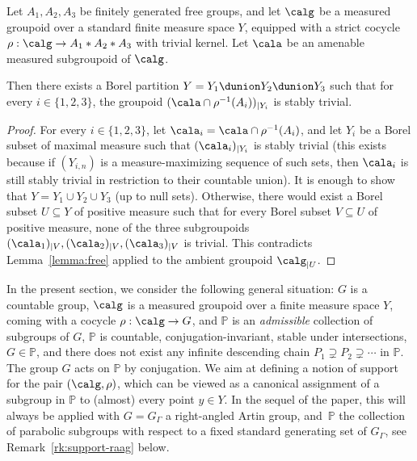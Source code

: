 \begin{cor}\label{cor:free-2}
Let $A_1,A_2,A_3$ be finitely generated free groups, and let $\calg$ be a measured groupoid over a standard finite measure space $Y$, equipped with a strict cocycle $\rho:\calg\to A_1\ast A_2\ast A_3$ with trivial kernel. Let $\cala$ be an amenable measured subgroupoid of $\calg$.

Then there exists a Borel partition $Y=Y_1\dunion Y_2\dunion Y_3$ such that for every $i\in\{1,2,3\}$, the groupoid $(\cala\cap\rho^{-1}(A_i))_{|Y_i}$ is stably trivial.
\end{cor}

\begin{proof}
For every $i\in\{1,2,3\}$, let $\cala_i=\cala\cap\rho^{-1}(A_i)$, and let $Y_i$ be a Borel subset of maximal measure such that $(\cala_i)_{|Y_i}$ is stably trivial (this exists because if $(Y_{i,n})$ is a measure-maximizing sequence of such sets, then $\cala_i$ is still stably trivial in restriction to their countable union). It is enough to show that $Y=Y_1\cup Y_2\cup Y_3$ (up to null sets). Otherwise, there would exist a Borel subset $U\subseteq Y$ of positive measure such that for every Borel subset $V\subseteq U$ of positive measure, none of the three subgroupoids $(\cala_1)_{|V},(\cala_2)_{|V},(\cala_3)_{|V}$ is trivial. This contradicts Lemma~\ref{lemma:free} applied to the ambient groupoid $\calg_{|U}$.
\end{proof}


In the present section, we consider the following general situation: $G$ is a countable group, $\calg$ is a measured groupoid over a finite measure space $Y$, coming with a cocycle $\rho:\calg\to G$, and $\mathbb{P}$ is an \emph{admissible} collection of subgroups of $G$, \ie $\mathbb{P}$ is countable, conjugation-invariant, stable under intersections, $G\in \mathbb {P}$, and there does not exist any infinite descending chain $P_1\supsetneq P_2\supsetneq\cdots$ in $\mathbb{P}$. The group $G$ acts on $\mathbb{P}$ by conjugation. We aim at defining a notion of support for the pair $(\calg,\rho)$, which can be viewed as a canonical assignment of a subgroup in $\mathbb{P}$ to (almost) every point $y\in Y$. In the sequel of the paper, this will always be applied with $G=G_\Gamma$ a right-angled Artin group, and~$\mathbb{P}$ the collection of parabolic subgroups with respect to a fixed standard generating set of $G_\Gamma$, see Remark~\ref{rk:support-raag} below.

